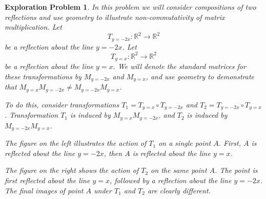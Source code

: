 \documentclass{ximera}
\newcommand{\RR}{\mathbb{R}}
\newtheorem{initprob}{Exploration Problem}
\begin{document}
\begin{initprob}\label{init:reflectioncomp}  In this problem we will consider compositions of two reflections and use geometry to illustrate non-commutativity of matrix multiplication.  
Let $$T_{y=-2x}:\RR^2\rightarrow \RR^2$$ be a reflection about the line $y=-2x$.  Let $$T_{y=x}:\RR^2\rightarrow \RR^2$$ be a reflection about the line $y=x$. We will denote the standard matrices for these transformations by $M_{y=-2x}$ and $M_{y=x}$, and
 use geometry to demonstrate that $M_{y=x}M_{y=-2x}\neq M_{y=-2x}M_{y=x}$.  
 
 To do this, consider transformations $T_1=T_{y=x}\circ T_{y=-2x}$ and $T_2=T_{y=-2x}\circ T_{y=x}$.  Transformation $T_1$ is induced by $M_{y=x}M_{y=-2x}$, and $T_2$ is induced by $M_{y=-2x}M_{y=x}$.

The figure on the left illustrates the action of $T_1$ on a single point $A$.  First, $A$ is reflected about the line $y=-2x$, then $A$ is reflected about the line $y=x$.   

The figure on the right shows the action of $T_2$ on the same point $A$.  The point is first reflected about the line $y=x$, followed by a reflection about the line $y=-2x$.  The final images of point $A$ under $T_1$ and $T_2$ are clearly different.

\begin{image}[4.5in]
  \quad\quad
\begin{tikzpicture}[scale=.3]
 

\end{tikzpicture}
\end{image}
\end{initprob}
\end{document}
